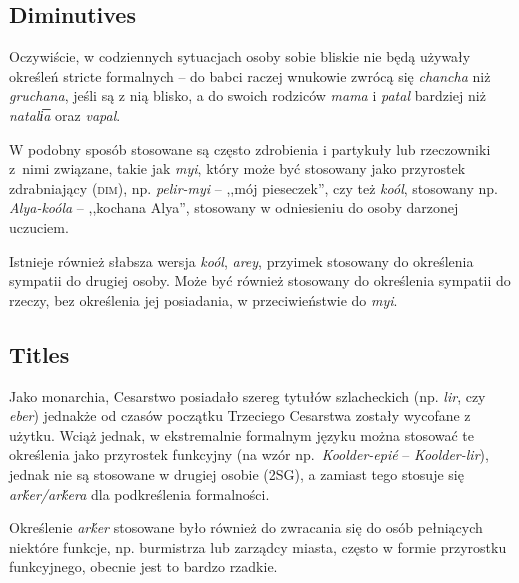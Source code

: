 \subsection{Diminutives}

Oczywiście, w codziennych sytuacjach osoby sobie bliskie nie będą używały
określeń stricte formalnych -- do babci raczej wnukowie zwrócą się
\emph{chancha} niż \emph{gruchana}, jeśli są z nią blisko, a do swoich rodziców
\emph{mama} i \emph{patal} bardziej niż \emph{natali͞a} oraz \emph{vapal}.

W podobny sposób stosowane są często zdrobienia i partykuły lub rzeczowniki
z~nimi związane, takie jak \emph{myi}, który może być stosowany jako przyrostek
zdrabniający (\textsc{dim}), np. \emph{pelir-myi} -- ,,mój pieseczek'', czy też
\emph{koól}, stosowany np. \emph{Alya-koóla} -- ,,kochana Alya'', stosowany w
odniesieniu do osoby darzonej uczuciem.

Istnieje również słabsza wersja \emph{koól}, \emph{arey}, przyimek stosowany do
określenia sympatii do drugiej osoby. Może być również stosowany do określenia
sympatii do rzeczy, bez określenia jej posiadania, w przeciwieństwie do
\emph{myi}.

\subsection{Titles}

Jako monarchia, Cesarstwo posiadało szereg tytułów szlacheckich (np. \emph{lir},
czy \emph{eber}) jednakże od czasów początku Trzeciego Cesarstwa zostały
wycofane z użytku. Wciąż jednak, w ekstremalnie formalnym języku można stosować
te określenia jako przyrostek funkcyjny (na wzór np.~\emph{Koolder-epié} --
\emph{Koolder-lir}), jednak nie są stosowane w drugiej osobie (\textsc{2SG}), a
zamiast tego stosuje się \emph{arḱer/arḱera} dla podkreślenia formalności.



Określenie \emph{arḱer} stosowane było również do zwracania się do osób
pełniących niektóre funkcje, np. burmistrza lub zarządcy miasta, często w formie
przyrostku funkcyjnego, obecnie jest to bardzo rzadkie.

